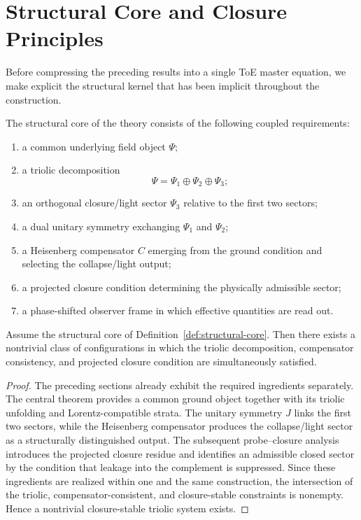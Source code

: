 \section{Structural Core and Closure Principles}
\label{sec:structural-core}

Before compressing the preceding results into a single ToE master equation, we
make explicit the structural kernel that has been implicit throughout the
construction.

\begin{definition}
\label{def:structural-core}
The structural core of the theory consists of the following coupled
requirements:
\begin{enumerate}
\item a common underlying field object $\Psi$;
\item a triolic decomposition
\[
  \Psi = \Psi_1\oplus\Psi_2\oplus\Psi_3;
\]
\item an orthogonal closure/light sector $\Psi_3$ relative to the first two
sectors;
\item a dual unitary symmetry exchanging $\Psi_1$ and $\Psi_2$;
\item a Heisenberg compensator $C$ emerging from the ground condition and
selecting the collapse/light output;
\item a projected closure condition determining the physically admissible
sector;
\item a phase-shifted observer frame in which effective quantities are read
out.
\end{enumerate}
\end{definition}

\begin{theorem}
\label{thm:structural-existence}
Assume the structural core of Definition~\ref{def:structural-core}. Then there
exists a nontrivial class of configurations in which the triolic decomposition,
compensator consistency, and projected closure condition are simultaneously
satisfied.
\end{theorem}

\begin{proof}
The preceding sections already exhibit the required ingredients separately.
The central theorem provides a common ground object together with its triolic
unfolding and Lorentz-compatible strata. The unitary symmetry $J$ links the
first two sectors, while the Heisenberg compensator produces the
collapse/light sector as a structurally distinguished output. The subsequent
probe--closure analysis introduces the projected closure residue and identifies
an admissible closed sector by the condition that leakage into the complement
is suppressed. Since these ingredients are realized within one and the same
construction, the intersection of the triolic, compensator-consistent, and
closure-stable constraints is nonempty. Hence a nontrivial closure-stable
triolic system exists.
\end{proof}

